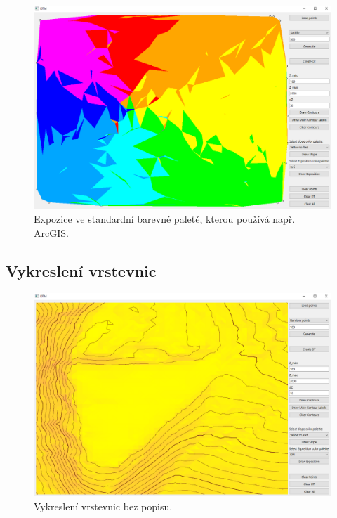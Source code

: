 \documentclass[a4paper, 12pt, oneside, titlepage]{article} %
\begin{document}
\begin{figure}[!htb]
	\centering
	\includegraphics[scale=0.45]{obrazky/exp_arcgis.png} 
	\caption{Expozice ve standardní barevné paletě, kterou používá např. ArcGIS.
	}
	\label{fig:exp_arcgis}
\end{figure} 
\FloatBarrier

\subsection{Vykreslení vrstevnic}
\begin{figure}[!htb]
	\centering
	\includegraphics[scale=0.45]{obrazky/vrst_bezpop.png} 
	\caption{Vykreslení vrstevnic bez popisu.
	}
	\label{fig:vrst_bezpop}
\end{figure} 
\FloatBarrier
\end{document}
